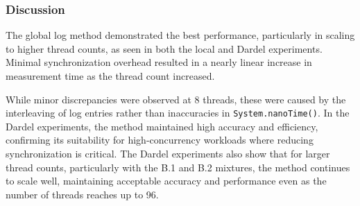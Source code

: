 \documentclass{article}
\begin{document}
\subsubsection{Discussion}
The global log method demonstrated the best performance, particularly in scaling to higher thread counts, as seen in both the local and Dardel experiments. Minimal synchronization overhead resulted in a nearly linear increase in measurement time as the thread count increased.

While minor discrepancies were observed at 8 threads, these were caused by the interleaving of log entries rather than inaccuracies in \texttt{System.nanoTime()}. In the Dardel experiments, the method maintained high accuracy and efficiency, confirming its suitability for high-concurrency workloads where reducing synchronization is critical. The Dardel experiments also show that for larger thread counts, particularly with the B.1 and B.2 mixtures, the method continues to scale well, maintaining acceptable accuracy and performance even as the number of threads reaches up to 96.


\newpage
\printbibliography
\end{document}

